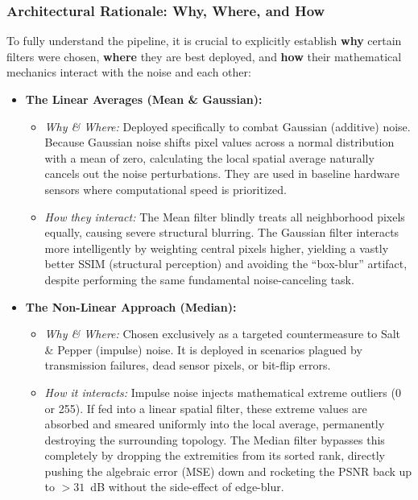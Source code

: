 \documentclass[a4paper,12pt]{article}
\begin{document}
\subsubsection{Architectural Rationale: Why, Where, and How}

To fully understand the pipeline, it is crucial to explicitly establish \textbf{why} certain filters were chosen, \textbf{where} they are best deployed, and \textbf{how} their mathematical mechanics interact with the noise and each other:

\begin{itemize}
    \item \textbf{The Linear Averages (Mean \& Gaussian):}
    \begin{itemize}
        \item \textit{Why \& Where:} Deployed specifically to combat Gaussian (additive) noise. Because Gaussian noise shifts pixel values across a normal distribution with a mean of zero, calculating the local spatial average naturally cancels out the noise perturbations. They are used in baseline hardware sensors where computational speed is prioritized.
        \item \textit{How they interact:} The Mean filter blindly treats all neighborhood pixels equally, causing severe structural blurring. The Gaussian filter interacts more intelligently by weighting central pixels higher, yielding a vastly better SSIM (structural perception) and avoiding the ``box-blur'' artifact, despite performing the same fundamental noise-canceling task.
    \end{itemize}

    \item \textbf{The Non-Linear Approach (Median):}
    \begin{itemize}
        \item \textit{Why \& Where:} Chosen exclusively as a targeted countermeasure to Salt \& Pepper (impulse) noise. It is deployed in scenarios plagued by transmission failures, dead sensor pixels, or bit-flip errors.
        \item \textit{How it interacts:} Impulse noise injects mathematical extreme outliers (0 or 255). If fed into a linear spatial filter, these extreme values are absorbed and smeared uniformly into the local average, permanently destroying the surrounding topology. The Median filter bypasses this completely by dropping the extremities from its sorted rank, directly pushing the algebraic error (MSE) down and rocketing the PSNR back up to $>31$~dB without the side-effect of edge-blur.
    \end{itemize}


\end{itemize}
\end{document}

